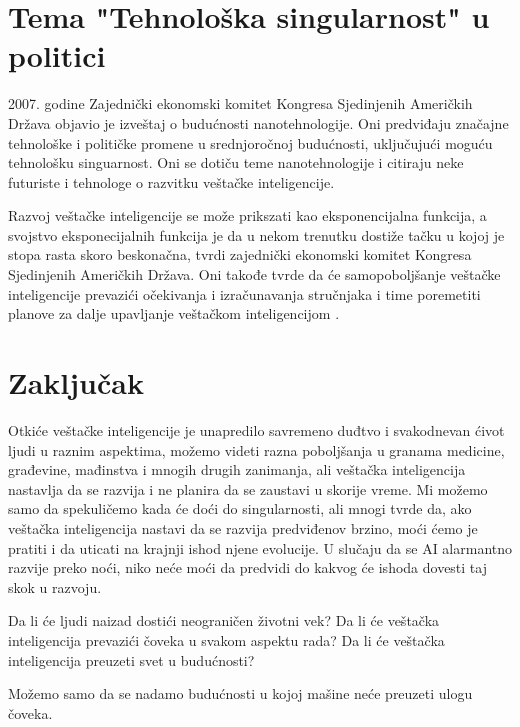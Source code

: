 \documentclass[a4paper]{article}
\begin{document}
\section{Tema "Tehnološka singularnost" u politici}
\label{sec:politika}
2007. godine Zajednički ekonomski komitet Kongresa Sjedinjenih Američkih Država objavio je izveštaj o budućnosti nanotehnologije. Oni predviđaju značajne tehnološke i političke promene u srednjoročnoj budućnosti, uključujući moguću tehnološku singuarnost. Oni se dotiču teme nanotehnologije i citiraju neke futuriste i tehnologe o razvitku veštačke inteligencije.

Razvoj veštačke inteligencije se može prikszati kao eksponencijalna funkcija, a svojstvo eksponecijalnih funkcija je da u nekom trenutku dostiže tačku u kojoj je stopa rasta skoro beskonačna, tvrdi zajednički ekonomski komitet Kongresa Sjedinjenih Američkih Država. Oni takođe tvrde da će samopoboljšanje veštačke inteligencije prevazići očekivanja i izračunavanja stručnjaka i time poremetiti planove za dalje upavljanje veštačkom inteligencijom
\cite{ref21}.

\section{Zaključak}
\label{sec:zakljucak}
Otkiće veštačke inteligencije je unapredilo savremeno duđtvo i svakodnevan ćivot ljudi u raznim aspektima, možemo videti razna poboljšanja u granama medicine, građevine, mađinstva i mnogih drugih zanimanja, ali veštačka inteligencija nastavlja da se razvija i ne planira da se zaustavi u skorije vreme. Mi možemo samo da spekuličemo kada će doći do singularnosti, ali mnogi tvrde da, ako veštačka inteligencija nastavi da se razvija predviđenov brzino, moći ćemo je pratiti i da uticati na krajnji ishod njene evolucije. U slučaju da se AI alarmantno razvije preko noći, niko neće moći da predvidi do kakvog će ishoda dovesti taj skok u razvoju.

Da li će ljudi naizad dostići neograničen životni vek? Da li će veštačka inteligencija prevazići čoveka u svakom aspektu rada? Da li će veštačka inteligencija preuzeti svet u budućnosti?

Možemo samo da se nadamo budućnosti u kojoj mašine neće preuzeti ulogu čoveka.

\appendix

\end{document}
